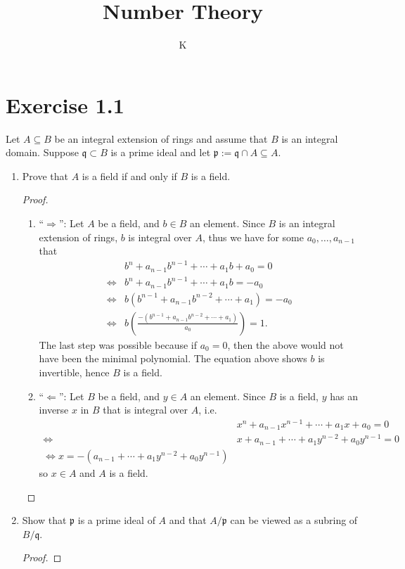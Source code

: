 \documentclass[a4paper]{article}
\title{Number Theory}
\author{K}
\begin{document}
\section*{Exercise 1.1}
Let \(A \subseteq B\) be an integral extension of rings and assume that \(B\) is an integral domain. Suppose \(\mathfrak{q} \subset B\) is a prime ideal and let \(\mathfrak{p} := \mathfrak{q} \cap A \subseteq A\).
\begin{enumerate}
    \item Prove that \(A\) is a field if and only if \(B\) is a field.
    \begin{proof}
        \begin{enumerate}
            \item ``\(\Rightarrow\)'': Let \(A\) be a field, and \(b \in B\) an element. Since \(B\) is an integral extension of rings, \(b\) is integral over \(A\), thus we have for some \(a_0, \ldots, a_{n-1}\) that
            \begin{align*}
                & b^n + a_{n-1} b^{n-1} + \cdots + a_1 b + a_0 = 0 \\
                \iff& b^n + a_{n-1} b^{n-1} + \cdots + a_1 b = - a_0 \\
                \iff& b (b^{n-1} + a_{n-1} b^{n-2} + \cdots + a_1) = - a_0 \\
                \iff& b \left(\frac{-(b^{n-1} + a_{n-1} b^{n-2} + \cdots + a_1)}{a_0}\right)  = 1 \text{.}
            \end{align*}
            The last step was possible because if \(a_0 = 0\), then the above would not have been the minimal polynomial. The equation above shows \(b\) is invertible, hence \(B\) is a field.
            \item ``\(\Leftarrow\)'': Let \(B\) be a field, and \(y \in A\) an element. Since \(B\) is a field, \(y\) has an inverse \(x\) in \(B\) that is integral over \(A\), i.e.
            \begin{align}
                & x^n + a_{n-1} x^{n-1} + \cdots + a_1 x + a_0 = 0 \\
                \iff & x + a_{n-1} + \cdots + a_1 y^{n-2} + a_0 y^{n-1} = 0 \\
                \iff x = -(a_{n-1} + \cdots + a_1 y^{n-2} + a_0 y^{n-1})
            \end{align}
            so \(x \in A\) and \(A\) is a field.
        \end{enumerate}
    \end{proof}
    \item Show that \(\mathfrak{p}\) is a prime ideal of \(A\) and that \(A / \mathfrak{p}\) can be viewed as a subring of \(B / \mathfrak{q}\).
    \begin{proof}
        
    \end{proof}
\end{enumerate}
\end{document}
